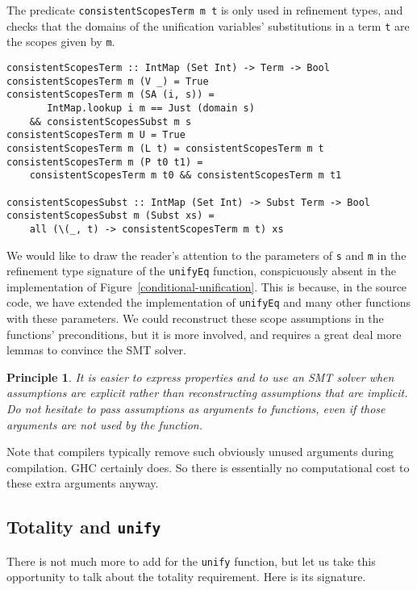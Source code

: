 \documentclass[sigconf]{acmart}
\newcommand{\tc}[1]{{\small\texttt{#1}}}
\newtheorem{principle}{Principle}
\begin{document}
The predicate \tc{consistentScopesTerm m t} is only used in refinement types, and
checks that the domains of the unification variables' substitutions in a term
\tc{t} are the scopes given by \tc{m}.

\begin{verbatim}
consistentScopesTerm :: IntMap (Set Int) -> Term -> Bool
consistentScopesTerm m (V _) = True
consistentScopesTerm m (SA (i, s)) =
       IntMap.lookup i m == Just (domain s)
    && consistentScopesSubst m s
consistentScopesTerm m U = True
consistentScopesTerm m (L t) = consistentScopesTerm m t
consistentScopesTerm m (P t0 t1) =
    consistentScopesTerm m t0 && consistentScopesTerm m t1

consistentScopesSubst :: IntMap (Set Int) -> Subst Term -> Bool
consistentScopesSubst m (Subst xs) =
    all (\(_, t) -> consistentScopesTerm m t) xs
\end{verbatim}

We would like to draw the reader's attention to the parameters of \tc{s}
and \tc{m} in the refinement type signature of the \tc{unifyEq} function,
conspicuously absent in the implementation of
Figure~\ref{conditional-unification}. This is because, in the source code,
we have extended the implementation of \tc{unifyEq} and many other functions
with these parameters. We could reconstruct these scope assumptions in the
functions' preconditions, but it is more involved, and requires a great deal more
lemmas to convince the SMT solver.

\begin{principle}
  It is easier to express properties and to use an SMT solver when assumptions
  are explicit rather than reconstructing assumptions that are implicit.
  Do not hesitate to pass assumptions as arguments to functions, even if those
  arguments are not used by the function.
\end{principle}

Note that compilers typically remove such obviously unused arguments during
compilation. GHC certainly does. So there is essentially no computational cost to
these extra arguments anyway.


\subsection{Totality and \tc{unify}}
\label{checking-unify}

There is not much more to add for the \tc{unify} function, but let us take this
opportunity to talk about the totality requirement. Here is its signature.
\end{document}
